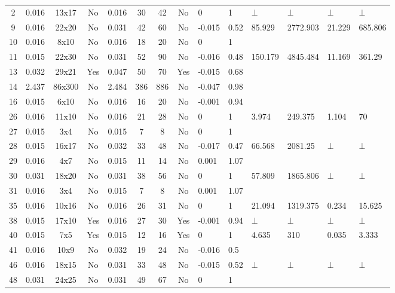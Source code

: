 \documentclass[11pt]{article}
\begin{document}
\begin{landscape}
\begin{small}
\begin{longtable}[c]{| c | c | c | c |c |c |c |c |p{1.5cm} |p{1.5cm} |p{1.5cm} |p{1.5cm} |p{1.5cm} |p{1.5cm} |}
 \hline
 \endfoot

 \hline

2 & 0.016 & 13x17 & No & 0.016 & 30 & 42 & No & 0 & 1 & $\bot$ & $\bot$ & $\bot$ & $\bot$\\
9 & 0.016 & 22x20 & No & 0.031 & 42 & 60 & No & -0.015 & 0.52 & 85.929 & 2772.903 & 21.229 & 685.806\\
10 & 0.016 & 8x10 & No & 0.016 & 18 & 20 & No & 0 & 1 &  &  &  & \\
11 & 0.015 & 22x30 & No & 0.031 & 52 & 90 & No & -0.016 & 0.48 & 150.179 & 4845.484 & 11.169 & 361.29\\
13 & 0.032 & 29x21 & Yes & 0.047 & 50 & 70 & Yes & -0.015 & 0.68 &  &  &  & \\
14 & 2.437 & 86x300 & No & 2.484 & 386 & 886 & No & -0.047 & 0.98 &  &  &  & \\
16 & 0.015 & 6x10 & No & 0.016 & 16 & 20 & No & -0.001 & 0.94 &  &  &  & \\
26 & 0.016 & 11x10 & No & 0.016 & 21 & 28 & No & 0 & 1 & 3.974 & 249.375 & 1.104 & 70\\
27 & 0.015 & 3x4 & No & 0.015 & 7 & 8 & No & 0 & 1 &  &  &  & \\
28 & 0.015 & 16x17 & No & 0.032 & 33 & 48 & No & -0.017 & 0.47 & 66.568 & 2081.25 & $\bot$ & $\bot$\\
29 & 0.016 & 4x7 & No & 0.015 & 11 & 14 & No & 0.001 & 1.07 &  &  &  & \\
30 & 0.031 & 18x20 & No & 0.031 & 38 & 56 & No & 0 & 1 & 57.809 & 1865.806 & $\bot$ & $\bot$\\
31 & 0.016 & 3x4 & No & 0.015 & 7 & 8 & No & 0.001 & 1.07 &  &  &  & \\
35 & 0.016 & 10x16 & No & 0.016 & 26 & 31 & No & 0 & 1 & 21.094 & 1319.375 & 0.234 & 15.625\\
38 & 0.015 & 17x10 & Yes & 0.016 & 27 & 30 & Yes & -0.001 & 0.94 & $\bot$ & $\bot$ & $\bot$ & $\bot$\\
40 & 0.015 & 7x5 & Yes & 0.015 & 12 & 16 & Yes & 0 & 1 & 4.635 & 310 & 0.035 & 3.333\\
41 & 0.016 & 10x9 & No & 0.032 & 19 & 24 & No & -0.016 & 0.5 &  &  &  & \\
46 & 0.016 & 18x15 & No & 0.031 & 33 & 48 & No & -0.015 & 0.52 & $\bot$ & $\bot$ & $\bot$ & $\bot$\\
48 & 0.031 & 24x25 & No & 0.031 & 49 & 67 & No & 0 & 1 &  &  &  & \\

\end{longtable}
\end{small}
\end{landscape}
\end{document}
